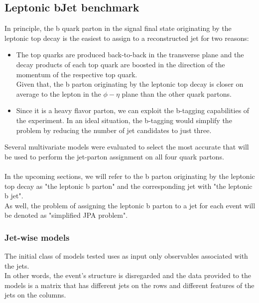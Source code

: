 \subsection{Leptonic bJet benchmark}
In principle, the b quark parton in the signal final state originating by the leptonic top decay is the easiest to assign to a reconstructed jet for two reasons:
\begin{itemize}
    \item The top quarks are produced back-to-back in the transverse plane and the decay products of each top quark are boosted in the direction of the momentum of the respective top quark.\\
    Given that, the b parton originating by the leptonic top decay is closer on average to the lepton in the $\phi-\eta$ plane than the other quark partons.
    \item Since it is a heavy flavor parton, we can exploit the b-tagging capabilities of the experiment. In an ideal situation, the b-tagging would simplify the problem by reducing the number of jet candidates to just three.
\end{itemize}
Several multivariate models were evaluated to select the most accurate that will be used to perform the jet-parton assignment on all four quark partons.\\
\\
In the upcoming sections, we will refer to the b parton originating by the leptonic top decay as "the leptonic b parton" and the corresponding jet with "the leptonic b jet".\\
As well, the problem of assigning the leptonic b parton to a jet for each event will be denoted as "simplified JPA problem".
\subsubsection*{Jet-wise models}
The initial class of models tested uses as input only observables associated with the jets.\\
In other words, the event's structure is disregarded and the data provided to the models is a matrix that has different jets on the rows and different features of the jets on the columns.  

